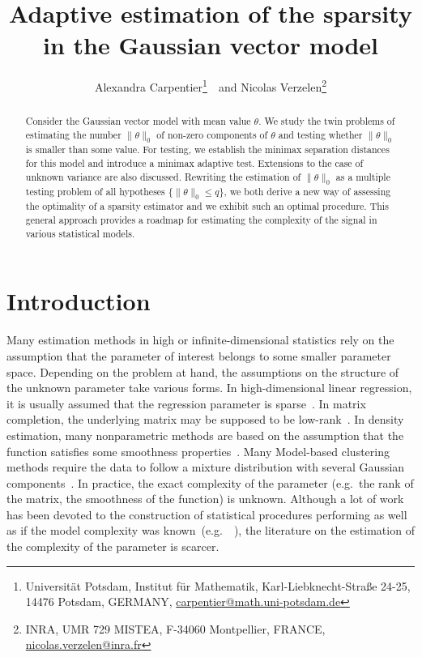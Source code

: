 \documentclass[twoside,11pt]{article}
\title{Adaptive estimation of the sparsity in the Gaussian vector model}
\author{Alexandra Carpentier\footnote{Universit\"at Potsdam, Institut f\"ur Mathematik, Karl-Liebknecht-Straße 24-25, 14476 Potsdam, GERMANY, \url{carpentier@math.uni-potsdam.de}}~\ and Nicolas Verzelen\footnote{INRA, UMR 729 MISTEA, F-34060 Montpellier, FRANCE, \url{nicolas.verzelen@inra.fr}}}
\newcommand{\<}{\langle}
\renewcommand{\>}{\rangle}
\begin{document}
\maketitle
\begin{abstract}
Consider the Gaussian vector model with mean value $\theta$. We study the twin problems of estimating the number $\|\theta\|_0$ of non-zero components of $\theta$ and testing whether $\|\theta\|_0$ is  smaller than some value. For testing, we establish the minimax separation distances for this model and introduce a minimax adaptive test. 
Extensions to the case of unknown variance are also discussed. Rewriting the estimation of $\|\theta\|_0$ as a multiple testing problem of all hypotheses $\{\|\theta\|_0\leq q\}$, we  both derive a new way of assessing the optimality of a sparsity estimator and we exhibit such an optimal procedure. This general approach provides a roadmap for estimating the complexity of the signal in various statistical models. 
\end{abstract}





\section{Introduction}



Many estimation methods in high or infinite-dimensional statistics rely on the assumption that the parameter of interest belongs to some smaller parameter space. Depending on the problem at hand, the assumptions on the structure of the unknown parameter 
take various forms. In high-dimensional linear regression, it is usually assumed that the regression parameter is sparse~\cite{buhlmann2011statistics}. In matrix completion, the underlying matrix may be supposed to be low-rank~\cite{keshavan2010matrix}. In density estimation, 
many nonparametric methods are based on the assumption that the function satisfies some smoothness properties~\cite{hardle2012wavelets}. Many Model-based clustering methods require the data to follow a mixture distribution with several Gaussian components~\cite{ESL}.
In practice, the exact complexity of the parameter (e.g.\  the rank of the matrix, the smoothness of the function) is unknown. 
Although a lot of work has been devoted to the construction of statistical procedures performing as well as if the model complexity was known~(e.g.\ ~\cite{buhlmann2011statistics,massart2007concentration,gine2015mathematical}), the literature on the estimation of the complexity of the parameter is scarcer.
\end{document}
